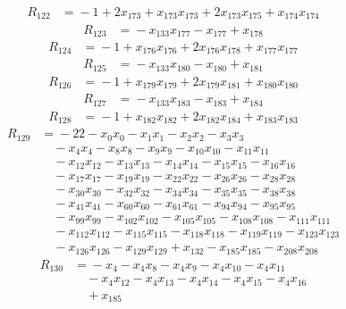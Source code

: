 \begin{align*}
R_{122}&={}-1 +2x_{173} +x_{173}x_{173} +2x_{173}x_{175} +x_{174}x_{174}
\end{align*}
\begin{align*}
R_{123}&={}-x_{133}x_{177} -x_{177} +x_{178}
\end{align*}
\begin{align*}
R_{124}&={}-1 +x_{176}x_{176} +2x_{176}x_{178} +x_{177}x_{177}
\end{align*}
\begin{align*}
R_{125}&={}-x_{133}x_{180} -x_{180} +x_{181}
\end{align*}
\begin{align*}
R_{126}&={}-1 +x_{179}x_{179} +2x_{179}x_{181} +x_{180}x_{180}
\end{align*}
\begin{align*}
R_{127}&={}-x_{133}x_{183} -x_{183} +x_{184}
\end{align*}
\begin{align*}
R_{128}&={}-1 +x_{182}x_{182} +2x_{182}x_{184} +x_{183}x_{183}
\end{align*}
\begin{align*}
R_{129}&={}-22 -x_{0}x_{0} -x_{1}x_{1} -x_{2}x_{2} -x_{3}x_{3}\\
&\quad{}-x_{4}x_{4} -x_{8}x_{8} -x_{9}x_{9} -x_{10}x_{10} -x_{11}x_{11}\\
&\quad{}-x_{12}x_{12} -x_{13}x_{13} -x_{14}x_{14} -x_{15}x_{15} -x_{16}x_{16}\\
&\quad{}-x_{17}x_{17} -x_{19}x_{19} -x_{22}x_{22} -x_{26}x_{26} -x_{28}x_{28}\\
&\quad{}-x_{30}x_{30} -x_{32}x_{32} -x_{34}x_{34} -x_{35}x_{35} -x_{38}x_{38}\\
&\quad{}-x_{41}x_{41} -x_{60}x_{60} -x_{61}x_{61} -x_{94}x_{94} -x_{95}x_{95}\\
&\quad{}-x_{99}x_{99} -x_{102}x_{102} -x_{105}x_{105} -x_{108}x_{108} -x_{111}x_{111}\\
&\quad{}-x_{112}x_{112} -x_{115}x_{115} -x_{118}x_{118} -x_{119}x_{119} -x_{123}x_{123}\\
&\quad{}-x_{126}x_{126} -x_{129}x_{129} +x_{132} -x_{185}x_{185} -x_{208}x_{208}
\end{align*}
\begin{align*}
R_{130}&={}-x_{4} -x_{4}x_{8} -x_{4}x_{9} -x_{4}x_{10} -x_{4}x_{11}\\
&\quad{}-x_{4}x_{12} -x_{4}x_{13} -x_{4}x_{14} -x_{4}x_{15} -x_{4}x_{16}\\
&\quad{}+x_{185}
\end{align*}
